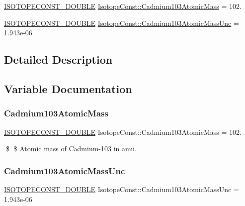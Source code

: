 \begin{DoxyCompactItemize}
\item 
\mbox{\hyperlink{group___isotope_const-_macros_ga8f45a7272ce02c0b4c65c44636ed719a}{I\+S\+O\+T\+O\+P\+E\+C\+O\+N\+S\+T\+\_\+\+D\+O\+U\+B\+LE}} \mbox{\hyperlink{group___isotope_const-_cadmium-_cd103_ga63240255fa2418935f83cbc0bbeb89ee}{Isotope\+Const\+::\+Cadmium103\+Atomic\+Mass}} = 102.
\item 
\mbox{\hyperlink{group___isotope_const-_macros_ga8f45a7272ce02c0b4c65c44636ed719a}{I\+S\+O\+T\+O\+P\+E\+C\+O\+N\+S\+T\+\_\+\+D\+O\+U\+B\+LE}} \mbox{\hyperlink{group___isotope_const-_cadmium-_cd103_ga2a9fa2f5d3b39652b1e63642375d1f4b}{Isotope\+Const\+::\+Cadmium103\+Atomic\+Mass\+Unc}} = 1.\+943e-\/06
\end{DoxyCompactItemize}


\subsection{Detailed Description}


\subsection{Variable Documentation}
\mbox{\label{group___isotope_const-_cadmium-_cd103_ga63240255fa2418935f83cbc0bbeb89ee}} 
\subsubsection{\texorpdfstring{Cadmium103\+Atomic\+Mass}{Cadmium103AtomicMass}}
{\footnotesize\ttfamily \mbox{\hyperlink{group___isotope_const-_macros_ga8f45a7272ce02c0b4c65c44636ed719a}{I\+S\+O\+T\+O\+P\+E\+C\+O\+N\+S\+T\+\_\+\+D\+O\+U\+B\+LE}} Isotope\+Const\+::\+Cadmium103\+Atomic\+Mass = 102.}

\$ \$ Atomic mass of Cadmium-\/103 in amu. \mbox{\label{group___isotope_const-_cadmium-_cd103_ga2a9fa2f5d3b39652b1e63642375d1f4b}} 
\subsubsection{\texorpdfstring{Cadmium103\+Atomic\+Mass\+Unc}{Cadmium103AtomicMassUnc}}
{\footnotesize\ttfamily \mbox{\hyperlink{group___isotope_const-_macros_ga8f45a7272ce02c0b4c65c44636ed719a}{I\+S\+O\+T\+O\+P\+E\+C\+O\+N\+S\+T\+\_\+\+D\+O\+U\+B\+LE}} Isotope\+Const\+::\+Cadmium103\+Atomic\+Mass\+Unc = 1.\+943e-\/06}

